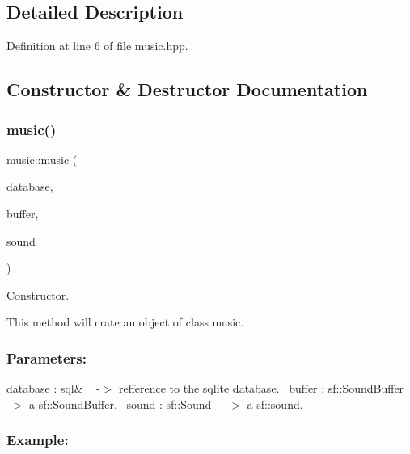 \subsection{Detailed Description}


Definition at line 6 of file music.\+hpp.



\subsection{Constructor \& Destructor Documentation}
\mbox{\label{classmusic_a08986f41efee0ffe77fcf819dd1bfc2d}} 
\subsubsection{\texorpdfstring{music()}{music()}}
{\footnotesize\ttfamily music\+::music (\begin{DoxyParamCaption}\item[{\hyperlink{classsql}{sql} \&}]{database,  }\item[{sf\+::\+Sound\+Buffer}]{buffer,  }\item[{sf\+::\+Sound}]{sound }\end{DoxyParamCaption})}



Constructor. 

This method will crate an object of class music.~\newline


\subsubsection*{Parameters\+: }

database \+: sql\& ~\newline
-\/$>$ refference to the sqlite database.~\newline
 buffer \+: sf\+::\+Sound\+Buffer ~\newline
-\/$>$ a sf\+::\+Sound\+Buffer.~\newline
 sound \+: sf\+::\+Sound ~\newline
-\/$>$ a sf\+::sound.~\newline


\subsubsection*{Example\+: }

